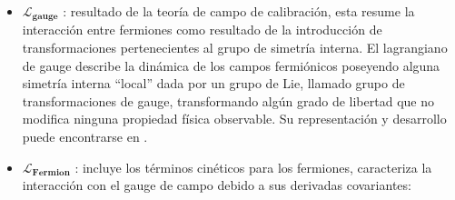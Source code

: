 \begin{itemize}

\item $\mathcal{L}_{\mathbf{gauge}}$ : resultado de la teoría de campo de calibración, esta resume la interacción entre fermiones como resultado de la introducción de transformaciones pertenecientes al grupo de simetría interna. %
El lagrangiano de gauge describe la dinámica de los campos fermiónicos poseyendo alguna simetría interna ``local'' dada por un grupo de Lie, llamado grupo de transformaciones de gauge, transformando algún grado de libertad que no modifica ninguna propiedad física observable. %
Su representación y desarrollo puede encontrarse en \cite{romao_resource_2012}.

\item $\mathcal{L}_{\mathbf{Fermion}}$ : incluye los términos cinéticos para los fermiones, caracteriza la interacción con el gauge de campo debido a sus derivadas covariantes:


\end{itemize}
